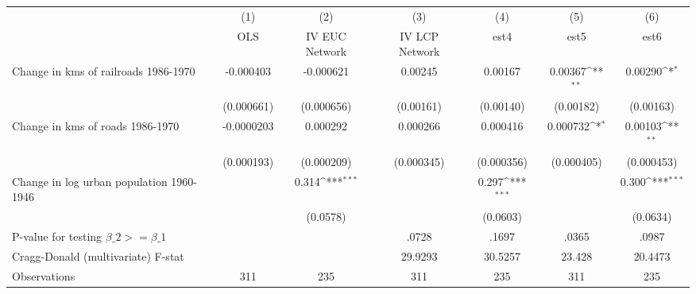 {
\def\sym#1{\ifmmode^{#1}\else\(^{#1}\)\fi}
\begin{tabular}{l*{6}{c}}
\hline\hline
                &\multicolumn{1}{c}{(1)}&\multicolumn{1}{c}{(2)}&\multicolumn{1}{c}{(3)}&\multicolumn{1}{c}{(4)}&\multicolumn{1}{c}{(5)}&\multicolumn{1}{c}{(6)}\\
                &\multicolumn{1}{c}{OLS}&\multicolumn{1}{c}{IV EUC Network}&\multicolumn{1}{c}{IV LCP Network}&\multicolumn{1}{c}{est4}&\multicolumn{1}{c}{est5}&\multicolumn{1}{c}{est6}\\
\hline
Change in kms of railroads 1986-1970&-0.000403         &-0.000621         &  0.00245         &  0.00167         &  0.00367\sym{**} &  0.00290\sym{*}  \\
                &(0.000661)         &(0.000656)         &(0.00161)         &(0.00140)         &(0.00182)         &(0.00163)         \\
[1em]
Change in kms of roads 1986-1970&-0.0000203         & 0.000292         & 0.000266         & 0.000416         & 0.000732\sym{*}  &  0.00103\sym{**} \\
                &(0.000193)         &(0.000209)         &(0.000345)         &(0.000356)         &(0.000405)         &(0.000453)         \\
[1em]
Change in log urban population 1960-1946&                  &    0.314\sym{***}&                  &    0.297\sym{***}&                  &    0.300\sym{***}\\
                &                  & (0.0578)         &                  & (0.0603)         &                  & (0.0634)         \\
\hline
P-value for testing $\beta\_{2} >= \beta\_{1}$&                  &                  &    .0728         &    .1697         &    .0365         &    .0987         \\
Cragg-Donald (multivariate) F-stat&                  &                  &  29.9293         &  30.5257         &   23.428         &  20.4473         \\
Observations    &      311         &      235         &      311         &      235         &      311         &      235         \\
\hline\hline
\end{tabular}
}
